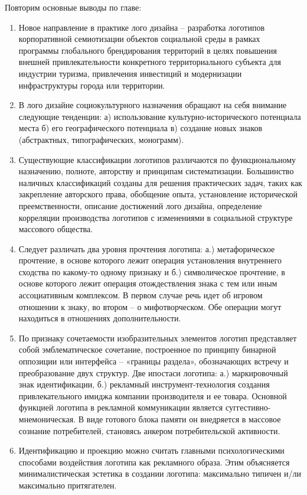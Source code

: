Повторим основные выводы по главе:
\begin{enumerate}
\item Новое направление в практике лого дизайна – разработка логотипов корпоративной семиотизации объектов  социальной среды в рамках программы глобального брендирования территорий в целях повышения внешней привлекательности конкретного территориального субъекта для индустрии туризма, привлечения инвестиций и модернизации инфраструктуры города или территории.
\item В лого дизайне социокультурного назначения обращают на себя внимание следующие тенденции: а) использование культурно-исторического потенциала места б) его географического потенциала в) создание новых знаков (абстрактных, типографических, монограмм).
\item Существующие классификации логотипов различаются по функциональному назначению, полноте, авторству и принципам систематизации. Большинство наличных классификаций созданы для решения практических задач, таких как закрепление авторского права, обобщение опыта, установление исторической преемственности, описание достижений лого дизайна, определение корреляции производства логотипов с изменениями в социальной структуре массового общества.
\item Следует различать два уровня прочтения логотипа: а.) метафорическое прочтение, в основе которого лежит операция установления внутреннего сходства по какому-то одному признаку  и б.) символическое прочтение, в основе которого лежит операция отождествления знака с тем или иным ассоциативным комплексом. В первом случае речь идет об игровом отношении к знаку, во втором – о мифотворческом. Обе операции могут находиться в отношениях дополнительности.
\item По признаку сочетаемости изобразительных элементов  логотип представляет собой эмблематическое сочетание, построенное по принципу бинарной оппозиции или интерфейса – «границы раздела», обозначающих встречу и преобразование двух структур.
Две ипостаси логотипа: а.) маркировочный знак идентификации, б.) рекламный инструмент-технология создания привлекательного имиджа компании производителя и ее товара. Основной функцией логотипа в рекламной коммуникации является суггестивно-мнемоническая. В виде готового блока памяти он внедряется в массовое сознание потребителей, становясь анкером потребительской активности.
\item Идентификацию и проекцию можно считать главными психологическими способами воздействия логотипа как рекламного образа. Этим объясняется минималистическая эстетика в создании логотипа: максимально типичен и/ли максимально притягателен.

\end{enumerate}
